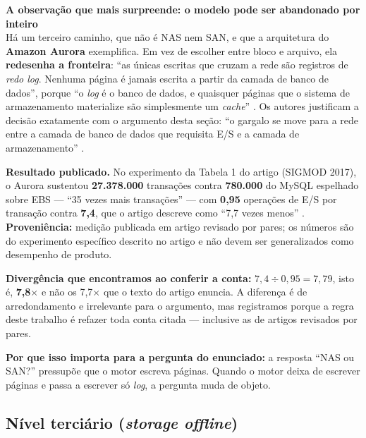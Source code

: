 \documentclass[11pt,a4paper]{article}
\newcommand{\destaque}[2]{%
  \begin{center}\begin{minipage}{0.96\textwidth}
  \colorbox{fundo}{\begin{minipage}{\dimexpr\linewidth-2\fboxsep}
  \vspace{2pt}\textbf{\color{azul}\small #1}\\[1pt]\footnotesize #2\vspace{3pt}
  \end{minipage}}\end{minipage}\end{center}}
\begin{document}
\destaque{A observação que mais surpreende: o modelo pode ser abandonado por inteiro}{%
Há um terceiro caminho, que não é NAS nem SAN, e que a arquitetura do \textbf{Amazon Aurora}
exemplifica. Em vez de escolher entre bloco e arquivo, ela \textbf{redesenha a fronteira}: ``as
únicas escritas que cruzam a rede são registros de \textit{redo log}. Nenhuma página é jamais
escrita a partir da camada de banco de dados'', porque ``o \textit{log} é o banco de dados, e
quaisquer páginas que o sistema de armazenamento materialize são simplesmente um \textit{cache}''
\cite{aurora2017}. Os autores justificam a decisão exatamente com o argumento desta seção: ``o
gargalo se move para a rede entre a camada de banco de dados que requisita E/S e a camada de
armazenamento'' \cite{aurora2017}.

\smallskip
\textbf{Resultado publicado.} No experimento da Tabela 1 do artigo (SIGMOD 2017), o Aurora sustentou
\textbf{27.378.000} transações contra \textbf{780.000} do MySQL espelhado sobre EBS --- ``35 vezes
mais transações'' --- com \textbf{0,95} operações de E/S por transação contra \textbf{7,4}, que o
artigo descreve como ``7,7 vezes menos'' \cite{aurora2017}. \textbf{Proveniência:} medição publicada
em artigo revisado por pares; os números são do experimento específico descrito no artigo e não
devem ser generalizados como desempenho de produto.

\smallskip
\textbf{Divergência que encontramos ao conferir a conta:} $7{,}4 \div 0{,}95 = 7{,}79$, isto é,
\textbf{7,8}$\times$ e não os 7,7$\times$ que o texto do artigo enuncia. A diferença é de
arredondamento e irrelevante para o argumento, mas registramos porque a regra deste trabalho é
refazer toda conta citada --- inclusive as de artigos revisados por pares.

\smallskip
\textbf{Por que isso importa para a pergunta do enunciado:} a resposta ``NAS ou SAN?'' pressupõe que
o motor escreva páginas. Quando o motor deixa de escrever páginas e passa a escrever só
\textit{log}, a pergunta muda de objeto.}

\subsection{Nível terciário (\textit{storage offline})}
\label{sec:recterciario}
\end{document}
